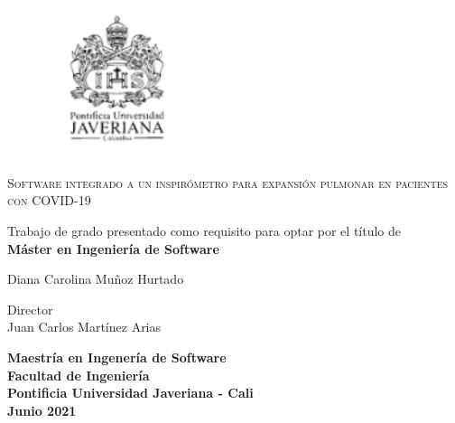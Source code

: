 \begin{titlepage}
	\centering
	\includegraphics[width=0.5\textwidth]{logo}\par\vspace{1cm}
	{\scshape\large Software integrado a un inspirómetro para expansi\'on pulmonar en pacientes con COVID-19 \par}
	\vspace{2cm}
	{ Trabajo de grado presentado como requisito para optar por el título de \\
    \textbf{Máster en Ingeniería de Software}\par}
	\vspace{1.5cm}
	
	{ Diana Carolina Mu\~noz Hurtado\par}
	\vspace{0.2cm}
	Director\\
	Juan Carlos Mart\'inez Arias

	\vspace{2cm}
    
    {\bfseries Maestría en Ingener\'ia de Software \\
    Facultad de Ingenier\'ia\\
    Pontificia Universidad Javeriana - Cali\\
    \vspace{1.2cm}
    Junio 2021\par}
    
\end{titlepage}